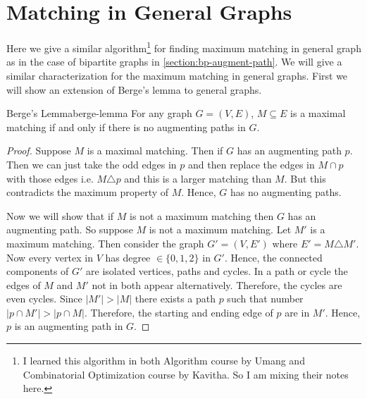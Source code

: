 \section{Matching in General Graphs}
Here we give a similar algorithm\footnote{I learned this algorithm in both Algorithm course by Umang and Combinatorial Optimization course by Kavitha. So I am mixing their notes here.} for finding maximum matching in general graph as in the case of bipartite graphs in \autoref{section:bp-augment-path}. We will give a similar characterization for the maximum matching in general graphs. First we will show an extension of Berge's lemma to general graphs.
\begin{Theorem}{Berge's Lemma}{berge-lemma}
	For any graph $G=(V,E)$, $M\subseteq E$ is a maximal matching if and only if there is no augmenting paths in $G$.
\end{Theorem}
\begin{proof}
	Suppose $M$ is a maximal matching. Then if $G$ has an augmenting path $p$. Then we can just take the odd edges in $p$ and then replace the edges in $M\cap p$ with those edges i.e. $M\triangle p$ and this is a larger matching than $M$. But this contradicts the maximum property of $M$. Hence, $G$ has no augmenting paths.

	Now we will show that if $M$ is not a maximum matching then $G$ has an augmenting path. So suppose $M$ is not a maximum matching. Let $M'$ is a maximum matching. Then consider the graph $G'=(V,E')$ where $E'=M\triangle M'$. Now every vertex in $V$ has degree $\in \{0,1,2\}$ in $G'$. Hence, the connected components of $G'$ are isolated vertices, paths and cycles. In a path or cycle the edges of $M$ and $M'$ not in both appear alternatively. Therefore, the cycles are even cycles. Since $|M'|>|M|$ there exists a path $p$ such that number $|p\cap M'|>|p\cap M|$. Therefore, the starting and ending edge of $p$ are in $M'$. Hence, $p$ is an augmenting path in $G$.
\end{proof}

